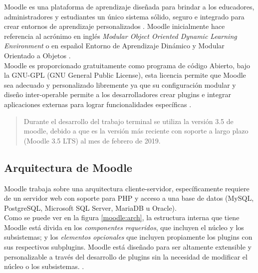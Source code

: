  Moodle es una plataforma de aprendizaje diseñada para brindar a los educadores, administradores
 y estudiantes un único sistema sólido, seguro e integrado para crear entornos de aprendizaje personalizados \cite{aboutMoodle}.
 Moodle inicialmente hace referencia al acrónimo en inglés {\it Modular Object Oriented Dynamic
 Learning Environment} o en español Entorno de Aprendizaje Dinámico y Modular Orientado a Objetos \cite{aboutMoodle19}.\\


 \noindent Moodle es proporcionado gratuitamente como programa de código Abierto, bajo la GNU-GPL
 (GNU General Public License), esta licencia permite que Moodle sea adecuado y personalizado libremente
 ya que su configuración modular y diseño inter-operable permite a los desarrolladores crear plugins
 e integrar aplicaciones externas para lograr funcionalidades específicas \cite{aboutMoodle}.


    \begin{quote}
    Durante el desarrollo del trabajo terminal se utiliza la versión 3.5 de moodle,
    debido a que es la versión más reciente con soporte a largo plazo (Moodle 3.5 LTS)
    al mes de febrero de 2019. \cite{moodleHistorial}
    \end{quote}


\subsection{Arquitectura de Moodle}

 Moodle trabaja sobre una arquitectura cliente-servidor, específicamente requiere de un servidor web
 con soporte para PHP y acceso a una base de datos (MySQL, PostgreSQL, Microsoft SQL Server, MariaDB
 u Oracle).\\

 \noindent Como se puede ver en la figura \ref{moodle:arch}, la estructura interna que tiene Moodle está
 divida en los {\it componentes requeridos}, que incluyen el núcleo y los subsistemas; y los {\it elementos
 opcionales} que incluyen propiamente los plugins con sus respectivos subplugins. Moodle está diseñado para
 ser altamente extensible y personalizable a través del desarrollo de plugins sin la necesidad de modificar
 el núcleo o los subsistemas. \cite{moodleArch}.

